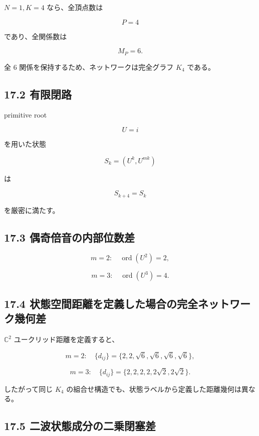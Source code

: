 \documentclass[
  a4paper,
]{ltjsarticle}
\begin{document}
\(N=1, K=4\) なら、全頂点数は

\[
P=4
\]

であり、全関係数は

\[
M_P=6.
\]

全 6 関係を保持するため、ネットワークは完全グラフ \(K_4\) である。

\subsection{17.2 有限閉路}\label{ux6709ux9650ux9589ux8def}

primitive root

\[
U=i
\]

を用いた状態

\[
S_k=(U^k,U^{mk})
\]

は

\[
S_{k+4}=S_k
\]

を厳密に満たす。

\subsection{17.3
偶奇倍音の内部位数差}\label{ux5076ux5947ux500dux97f3ux306eux5185ux90e8ux4f4dux6570ux5dee}

\[
m=2:
\quad
\operatorname{ord}(U^2)=2,
\]

\[
m=3:
\quad
\operatorname{ord}(U^3)=4.
\]

\subsection{17.4
状態空間距離を定義した場合の完全ネットワーク幾何差}\label{ux72b6ux614bux7a7aux9593ux8dddux96e2ux3092ux5b9aux7fa9ux3057ux305fux5834ux5408ux306eux5b8cux5168ux30cdux30c3ux30c8ux30efux30fcux30afux5e7eux4f55ux5dee}

\(\mathbb C^2\) ユークリッド距離を定義すると、

\[
m=2:
\quad
\{d_{ij}\}
=
\{2,2,\sqrt6,\sqrt6,\sqrt6,\sqrt6\},
\]

\[
m=3:
\quad
\{d_{ij}\}
=
\{2,2,2,2,2\sqrt2,2\sqrt2\}.
\]

したがって同じ \(K_4\)
の組合せ構造でも、状態ラベルから定義した距離幾何は異なる。

\subsection{17.5
二波状態成分の二乗閉塞差}\label{ux4e8cux6ce2ux72b6ux614bux6210ux5206ux306eux4e8cux4e57ux9589ux585eux5dee}
\end{document}
